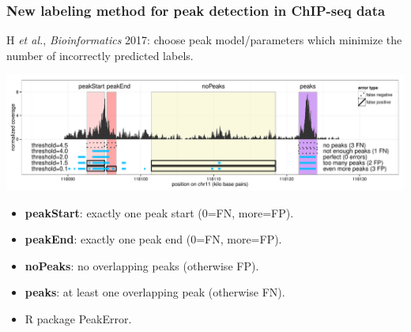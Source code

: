 \documentclass{beamer}
\begin{document}


\begin{frame}
  \frametitle{New labeling method for peak detection in ChIP-seq data}

  H {\it et al.}, {\it Bioinformatics} 2017: choose peak model/parameters
  which minimize the number of incorrectly predicted labels.

  \includegraphics[width=\textwidth]{figure-PeakError.pdf}
  \begin{itemize}
  \item \textbf{peakStart}: exactly one peak start (0=FN, more=FP).
  \item \textbf{peakEnd}: exactly one peak end (0=FN, more=FP).
  \item \textbf{noPeaks}: no overlapping peaks (otherwise FP).
  \item \textbf{peaks}: at least one overlapping peak (otherwise FN).
  \item R package PeakError.
  \end{itemize}
\end{frame}
\end{document}
